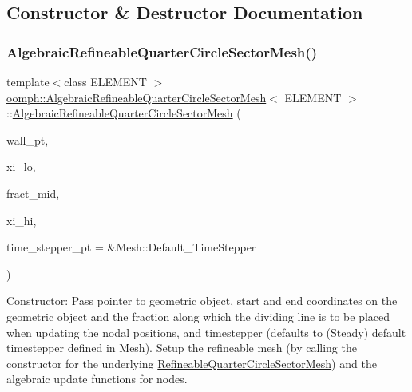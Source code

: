 \subsection{Constructor \& Destructor Documentation}
\mbox{\label{classoomph_1_1AlgebraicRefineableQuarterCircleSectorMesh_a4245d6f0499af21053a0381bc69de271}} 
\subsubsection{\texorpdfstring{Algebraic\+Refineable\+Quarter\+Circle\+Sector\+Mesh()}{AlgebraicRefineableQuarterCircleSectorMesh()}}
{\footnotesize\ttfamily template$<$class E\+L\+E\+M\+E\+NT $>$ \\
\hyperlink{classoomph_1_1AlgebraicRefineableQuarterCircleSectorMesh}{oomph\+::\+Algebraic\+Refineable\+Quarter\+Circle\+Sector\+Mesh}$<$ E\+L\+E\+M\+E\+NT $>$\+::\hyperlink{classoomph_1_1AlgebraicRefineableQuarterCircleSectorMesh}{Algebraic\+Refineable\+Quarter\+Circle\+Sector\+Mesh} (\begin{DoxyParamCaption}\item[{Geom\+Object $\ast$}]{wall\+\_\+pt,  }\item[{const double \&}]{xi\+\_\+lo,  }\item[{const double \&}]{fract\+\_\+mid,  }\item[{const double \&}]{xi\+\_\+hi,  }\item[{Time\+Stepper $\ast$}]{time\+\_\+stepper\+\_\+pt = {\ttfamily \&Mesh\+:\+:Default\+\_\+TimeStepper} }\end{DoxyParamCaption})\hspace{0.3cm}{\ttfamily [inline]}}



Constructor\+: Pass pointer to geometric object, start and end coordinates on the geometric object and the fraction along which the dividing line is to be placed when updating the nodal positions, and timestepper (defaults to (Steady) default timestepper defined in Mesh). Setup the refineable mesh (by calling the constructor for the underlying \hyperlink{classoomph_1_1RefineableQuarterCircleSectorMesh}{Refineable\+Quarter\+Circle\+Sector\+Mesh}) and the algebraic update functions for nodes. 



